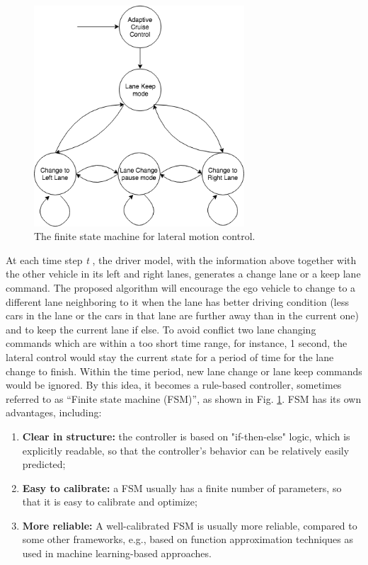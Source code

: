 \begin{figure}[h]
\centering
\includegraphics[width=0.7\textwidth]{figs/ch3/state-machine}
\caption{The finite state machine for lateral motion control.}
\label{fig:fsm}
\end{figure}

At each time step \textit{t} , the driver model, with the information above together with the other vehicle in its left and right lanes, generates a change lane or a keep lane command. The proposed algorithm will encourage the ego vehicle to change to a different lane neighboring to it when the lane has better driving condition (less cars in the lane or the cars in that lane are further away than in the current one) and to keep the current lane if else. To avoid conflict two lane changing commands which are within a too short time range, for instance, 1 second, the lateral control would stay the current state for a period of time for the lane change to finish. Within the time period, new lane change or lane keep commands would be ignored. By this idea, it becomes a rule-based controller, sometimes referred to as ``Finite state machine (FSM)'', as shown in Fig. \ref{fig:fsm}. FSM has its own advantages, including:

\begin{enumerate}
\item \textbf {Clear in structure:} the controller is based on "if-then-else" logic, which is explicitly readable, so that the controller's behavior can be relatively easily predicted; 
\item \textbf {Easy to calibrate:} a FSM usually has a finite number of parameters, so that it is easy to calibrate and optimize;
\item \textbf {More reliable:} A well-calibrated FSM is usually more reliable, compared to some other frameworks, e.g., based on function approximation techniques as used in machine learning-based approaches.  
\end{enumerate}


